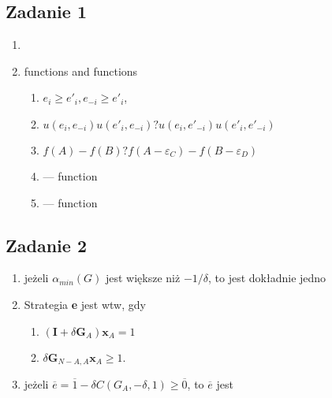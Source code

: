\subsection{Zadanie 1}
\begin{enumerate}
    \item
    \item
         functions and  functions
        \begin{enumerate}
            \item
                $e_i \geq e'_i, e_{-i} \geq e'_i$,
            \item
                $ u(e_i, e_{-i}) u(e'_i, e_{-i}) ?  u(e_i, e'_{-i}) u(e'_i, e'_{-i}) $
            \item
                $ f(A) - f(B) ?  f(A - \varepsilon_C) - f(B - \varepsilon_D) $
            \item
                --- function
            \item
                --- function
        \end{enumerate}
\end{enumerate}

\subsection{Zadanie 2}
\begin{enumerate}
  \item
    jeżeli $\alpha_{min}(G)$ jest większe niż $-1/\delta$, to jest dokładnie jedno
  \item Strategia \textbf{e} jest  wtw, gdy
    \begin{enumerate}
      \item $ (\textbf{I} + \delta \textbf{G}_{A})\textbf{x}_{A} = 1$
      \item $ \delta\textbf{G}_{N-A,A}\textbf{x}_A \geq 1.$
    \end{enumerate}
  \item
    jeżeli $\overline{e} = \overline{1} - \delta C(G_A, -\delta, 1) \geq \overline{0}$,
    to $\overline{e}$  jest 
\end{enumerate}

